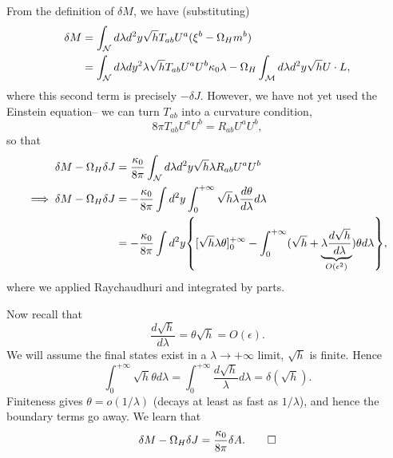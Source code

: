 From the definition of $\delta M$, we have (substituting)
\begin{align*}
    \delta M &= \int_\mathcal N d\lambda d^2y \sqrt{h} T_{ab} U^a(\xi^b -\Omega_H m^b)\\
        &= \int_\mathcal N d\lambda dy^2 \lambda \sqrt{h } T_{ab} U^a U^b \kappa_0 \lambda -\Omega_H \int_{\mathcal{M}} d\lambda d^2y \sqrt{h} U\cdot L,
\end{align*}
where this second term is precisely $-\delta J$. However, we have not yet used the Einstein equation-- we can turn $T_{ab}$ into a curvature condition,
\begin{equation}
    8\pi T_{ab} U^a U^b = R_{ab} U^a U^b,
\end{equation}
so that
\begin{align*}
    \delta M -\Omega_H \delta J &= \frac{\kappa_0}{8\pi} \int_\cN d\lambda d^2 y \sqrt{h} \lambda R_{ab} U^a U^b\\
    \implies \delta M -\Omega_H \delta J &= -\frac{\kappa_0}{8\pi} \int d^2y \int_0^{+\infty} \sqrt{h} \lambda \frac{d\theta}{d\lambda} d\lambda\\
    &= -\frac{\kappa_0}{8\pi} \int d^2y \set*{ [\sqrt{h}\lambda\theta]_0^{+\infty} -\int_0^{+\infty}(\sqrt{h}+ \underbrace{\lambda \frac{d\sqrt{h}}{d\lambda}}_{O(\epsilon^2)})\theta d\lambda},
\end{align*}
where we applied Raychaudhuri and integrated by parts.

Now recall that
\begin{equation}
    \frac{d\sqrt{h}}{d\lambda}=\theta\sqrt{h}=O(\epsilon).
\end{equation}
We will assume the final states exist in a $\lambda\to +\infty$ limit, $\sqrt{h}$ is finite. Hence
\begin{equation}
    \int_0^{+\infty} \sqrt{h}\theta d\lambda = \int_0^{+\infty} \frac{d\sqrt{h}}{\lambda} d\lambda = \delta(\sqrt{h}).
\end{equation}
Finiteness gives $\theta = o(1/\lambda)$ (decays at least as fast as $1/\lambda$), and hence the boundary terms go away. We learn that
\begin{equation}
    \delta M-\Omega_H \delta J = \frac{\kappa_0}{8\pi} \delta A. \qed
\end{equation}